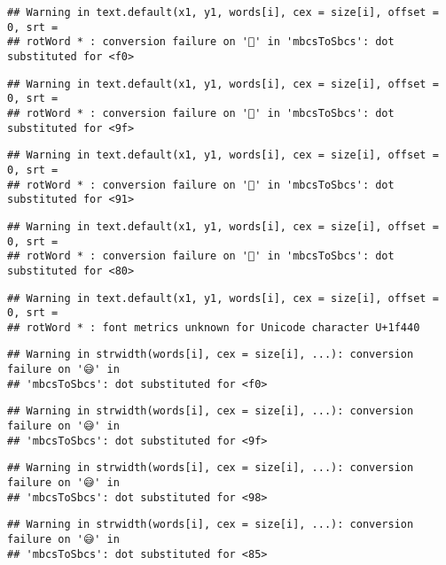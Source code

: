 \documentclass[
]{article}
\begin{document}
\begin{verbatim}
## Warning in text.default(x1, y1, words[i], cex = size[i], offset = 0, srt =
## rotWord * : conversion failure on '👀' in 'mbcsToSbcs': dot substituted for <f0>
\end{verbatim}

\begin{verbatim}
## Warning in text.default(x1, y1, words[i], cex = size[i], offset = 0, srt =
## rotWord * : conversion failure on '👀' in 'mbcsToSbcs': dot substituted for <9f>
\end{verbatim}

\begin{verbatim}
## Warning in text.default(x1, y1, words[i], cex = size[i], offset = 0, srt =
## rotWord * : conversion failure on '👀' in 'mbcsToSbcs': dot substituted for <91>
\end{verbatim}

\begin{verbatim}
## Warning in text.default(x1, y1, words[i], cex = size[i], offset = 0, srt =
## rotWord * : conversion failure on '👀' in 'mbcsToSbcs': dot substituted for <80>
\end{verbatim}

\begin{verbatim}
## Warning in text.default(x1, y1, words[i], cex = size[i], offset = 0, srt =
## rotWord * : font metrics unknown for Unicode character U+1f440
\end{verbatim}

\begin{verbatim}
## Warning in strwidth(words[i], cex = size[i], ...): conversion failure on '😅' in
## 'mbcsToSbcs': dot substituted for <f0>
\end{verbatim}

\begin{verbatim}
## Warning in strwidth(words[i], cex = size[i], ...): conversion failure on '😅' in
## 'mbcsToSbcs': dot substituted for <9f>
\end{verbatim}

\begin{verbatim}
## Warning in strwidth(words[i], cex = size[i], ...): conversion failure on '😅' in
## 'mbcsToSbcs': dot substituted for <98>
\end{verbatim}

\begin{verbatim}
## Warning in strwidth(words[i], cex = size[i], ...): conversion failure on '😅' in
## 'mbcsToSbcs': dot substituted for <85>
\end{verbatim}
\end{document}
